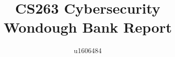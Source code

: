 \documentclass[12pt]{article}
\title{
    CS263 Cybersecurity \\
    Wondough Bank Report
}
\author{u1606484}
\begin{document}
    \maketitle

    \newpage

    \twocolumn

    
    
    


    
    
\end{document}
